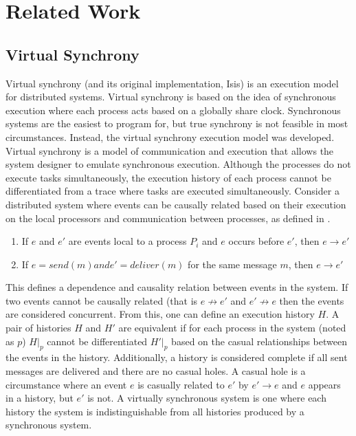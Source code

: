 \chapter{Related Work}
\section{Virtual Synchrony}
Virtual synchrony (and its original implementation, Isis) is an execution model for distributed systems. Virtual synchrony is based on the idea of synchronous execution where each process acts based on a globally share clock. Synchronous systems are the easiest to program for, but true synchrony is not feasible in most circumstances. Instead, the virtual synchrony execution model was developed. 
Virtual synchrony is a model of communication and execution that allows the system designer to emulate synchronous execution. Although the processes do not execute tasks simultaneously, the execution history of each process cannot be differentiated from a trace where tasks are executed simultaneously. 
Consider a distributed system where events can be causally related based on their execution on the local processors and communication between processes, as defined in \cite[p~.101]{ISISTOOLKIT}. 
\begin{enumerate}
    \item If $e$ and $e'$ are events local to a process $P_{i}$ and $e$ occurs before $e'$, then $e \rightarrow e'$
    \item If $e = send(m) and e'=deliver(m)$ for the same message $m$, then $e \rightarrow e'$
\end{enumerate} \cite[p~.101]{ISISTOOLKIT}
This defines a dependence and causality relation between events in the system. If two events cannot be causally related (that is $e \not\rightarrow e'$ and $e' \not\rightarrow e$ then the events are considered concurrent. From this, one can define an execution history $H$. A pair of histories $H$ and $H'$ are equivalent if for each process in the system (noted as $p$) $H|_{p}$ cannot be differentiated $H'|_{p}$ based on the casual relationships between the events in the history. \cite[p~.103]{ISISTOOLKIT} Additionally, a history is considered complete if all sent messages are delivered and there are no casual holes. A casual hole is a circumstance where an event $e$ is casually related to $e'$ by $e' \rightarrow e$ and $e$ appears in a history, but $e'$ is not. A virtually synchronous system is one where each history the system is indistinguishable from all histories produced by a synchronous system. \cite[p~.104]{ISISTOOLKIT}
